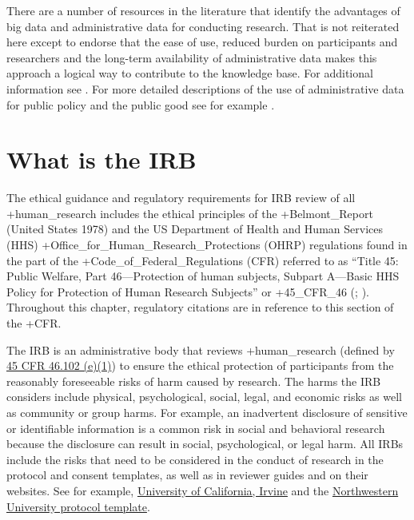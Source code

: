 \documentclass[
]{book}
\begin{document}
There are a number of resources in the literature that identify the advantages of big data and administrative data for conducting research. That is not reiterated here except to endorse that the ease of use, reduced burden on participants and researchers and the long-term availability of administrative data makes this approach a logical way to contribute to the knowledge base. For additional information see \citep{feeney2015, connelly2016, collmann2016}. For more detailed descriptions of the use of administrative data for public policy and the public good see for example \citep{card2010, collmann2016, figlio2016}.

\hypertarget{what-is-the-irb}{%
\section{What is the IRB}\label{what-is-the-irb}}

The ethical guidance and regulatory requirements for IRB review of all +human\_research\textbar{} includes the ethical principles of the +Belmont\_Report\textbar{} (United States 1978) and the US Department of Health and Human Services (HHS) +Office\_for\_Human\_Research\_Protections\textbar{} (OHRP) regulations found in the part of the +Code\_of\_Federal\_Regulations\textbar{} (CFR) referred to as ``Title 45: Public Welfare, Part 46---Protection of human subjects, Subpart A---Basic HHS Policy for Protection of Human Research Subjects'' or +45\_CFR\_46\textbar{} (\citet{codeoffederalregulations2017c}; \citet{officeforhumanresearchprotections2016}). Throughout this chapter, regulatory citations are in reference to this section of the +CFR\textbar.

The IRB is an administrative body that reviews +human\_research\textbar{} (defined by \href{https://www.law.cornell.edu/cfr/text/45/46.102}{45 CFR 46.102 (e)(1)}) to ensure the ethical protection of participants from the reasonably foreseeable risks of harm caused by research. The harms the IRB considers include physical, psychological, social, legal, and economic risks as well as community or group harms. For example, an inadvertent disclosure of sensitive or identifiable information is a common risk in social and behavioral research because the disclosure can result in social, psychological, or legal harm. All IRBs include the risks that need to be considered in the conduct of research in the protocol and consent templates, as well as in reviewer guides and on their websites. See for example, \href{https://research.uci.edu/compliance/human-research-protections/irb-members/assessing-risks-and-benefits.html}{University of California, Irvine} and the \href{https://www.irb.northwestern.edu/templates-forms-sops}{Northwestern University protocol template}.
\end{document}
